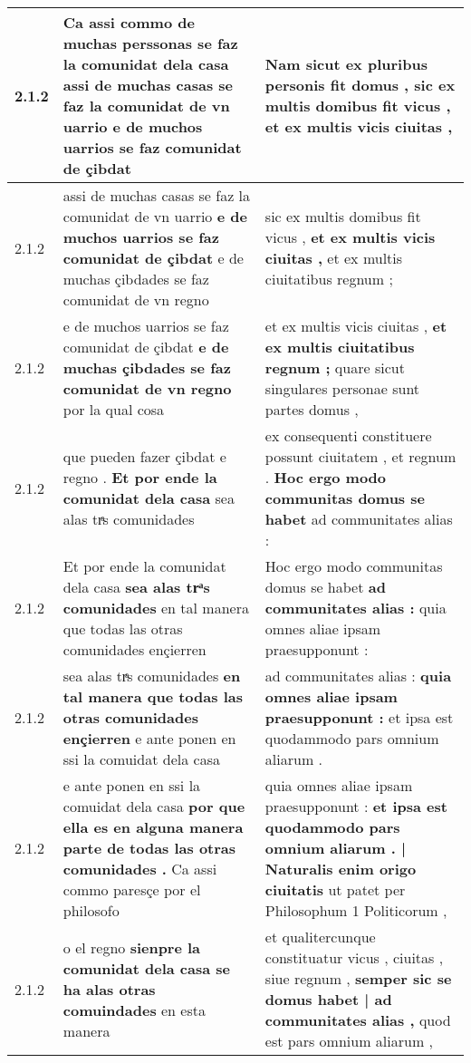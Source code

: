 \begin{tabular}{|p{1cm}|p{6.5cm}|p{6.5cm}|}
2.1.2 & Ca assi commo de muchas perssonas se faz la comunidat dela casa \textbf{ assi de muchas casas se faz la comunidat de vn uarrio } e de muchos uarrios se faz comunidat de çibdat & Nam sicut ex pluribus personis fit domus , \textbf{ sic ex multis domibus fit vicus , } et ex multis vicis ciuitas , \\\hline
2.1.2 & assi de muchas casas se faz la comunidat de vn uarrio \textbf{ e de muchos uarrios se faz comunidat de çibdat } e de muchas çibdades se faz comunidat de vn regno & sic ex multis domibus fit vicus , \textbf{ et ex multis vicis ciuitas , } et ex multis ciuitatibus regnum ; \\\hline
2.1.2 & e de muchos uarrios se faz comunidat de çibdat \textbf{ e de muchas çibdades se faz comunidat de vn regno } por la qual cosa & et ex multis vicis ciuitas , \textbf{ et ex multis ciuitatibus regnum ; } quare sicut singulares personae sunt partes domus , \\\hline
2.1.2 & que pueden fazer çibdat e regno . \textbf{ Et por ende la comunidat dela casa } sea alas trͣs comunidades & ex consequenti constituere possunt ciuitatem , et regnum . \textbf{ Hoc ergo modo communitas domus se habet } ad communitates alias : \\\hline
2.1.2 & Et por ende la comunidat dela casa \textbf{ sea alas trͣs comunidades } en tal manera que todas las otras comunidades ençierren & Hoc ergo modo communitas domus se habet \textbf{ ad communitates alias : } quia omnes aliae ipsam praesupponunt : \\\hline
2.1.2 & sea alas trͣs comunidades \textbf{ en tal manera que todas las otras comunidades ençierren } e ante ponen en ssi la comuidat dela casa & ad communitates alias : \textbf{ quia omnes aliae ipsam praesupponunt : } et ipsa est quodammodo pars omnium aliarum . \\\hline
2.1.2 & e ante ponen en ssi la comuidat dela casa \textbf{ por que ella es en alguna manera parte de todas las otras comunidades . } Ca assi commo paresçe por el philosofo & quia omnes aliae ipsam praesupponunt : \textbf{ et ipsa est quodammodo pars omnium aliarum . | Naturalis enim origo ciuitatis } ut patet per Philosophum 1 Politicorum , \\\hline
2.1.2 & o el regno \textbf{ sienpre la comunidat dela casa se ha alas otras comuindades } en esta manera & et qualitercunque constituatur vicus , ciuitas , siue regnum , \textbf{ semper sic se domus habet | ad communitates alias , } quod est pars omnium aliarum , \\\hline

\end{tabular}
